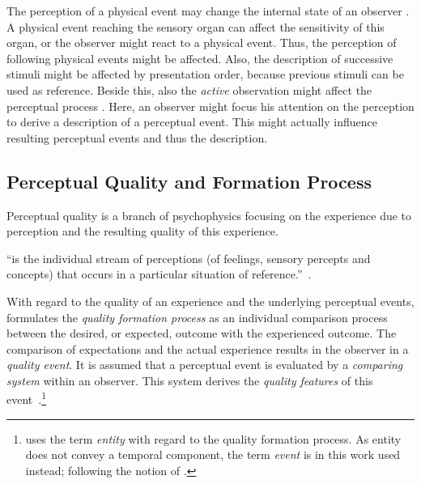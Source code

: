 The perception of a physical event may change the internal state of an observer \citep{raake_quality_2014}.
A physical event reaching the sensory organ can affect the sensitivity of this organ, or the observer might react to a physical event.
Thus, the perception of following physical events might be affected.
Also, the description of successive stimuli might be affected by presentation order, because previous stimuli can be used as reference.
Beside this, also the \emph{active} observation might affect the perceptual process \citep[][p.~30]{raake_quality_2014}.
Here, an observer might focus his attention on the perception to derive a description of a perceptual event.
This might actually influence resulting perceptual events and thus the description.


\subsection{Perceptual Quality and Formation Process}\label{related:perceivedQuality}
Perceptual quality is a branch of psychophysics focusing on the experience due to perception and the resulting quality of this experience.
\begin{definition}[Experiencing]
``is the individual stream of perceptions (of feelings, sensory percepts and concepts) that occurs in a particular situation of reference.''~\citep[p.~13]{raake_quality_2014}.
\end{definition}

With regard to the quality of an experience and the underlying perceptual events, \citet{jekosch_voice_2005} formulates the \emph{quality formation process} as an individual comparison process between the desired, or expected, outcome with the experienced outcome.
The comparison of expectations and the actual experience results in the observer in a \emph{quality event}.
It is assumed that a perceptual event is evaluated by a \emph{comparing system} within an observer.
This system  derives the \emph{quality features} of this event~\citep[\cf,][p.~17]{jekosch_voice_2005}.\footnote{\citet{jekosch_voice_2005} uses the term \emph{entity} with regard to the quality formation process.
As entity does not convey a temporal component, the term \emph{event} is in this work used instead; following the notion of \citet{blauert_spatial_1996}.}


